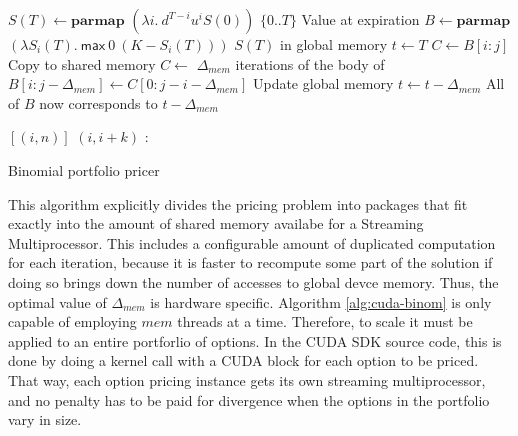 \begin{algorithm}
\begin{algorithmic}
  \State $S(T) \gets \mathbf{parmap}$ $(\lambda i.\ d^{T-i}u^{i}S(0))$ $\{0..T\}$ \Comment Value at expiration
  \State $B \gets \mathbf{parmap}$ $(\lambda S_i(T).\ \mathsf{max}\ 0\ (K-S_i(T)))$ $S(T)$ \Comment in global memory
  \State $t \gets T$
      \State $C \gets B[i:j] $ \Comment Copy to shared memory
      \State $C \gets$ $\Delta_{mem}$ iterations of the body of 
      \State $B[i:j-\Delta_{mem}] \gets C[0:j-i-\Delta_{mem}] $ \Comment Update global memory
    \EndFor
    \State $t \gets t -\Delta_{mem}$ \Comment All of $B$ now corresponds to $t -\Delta_{mem}$
  \EndWhile
\EndFunction

\State\Return $[(i,n)]$
\Else
\State
\Return $(i,i+k)$ : 
\EndIf
\EndFunction
\end{algorithmic}
\caption{Binomial portfolio pricer}
\label{alg:cuda-binom}
\end{algorithm}

This algorithm explicitly divides the pricing problem into packages that fit
exactly into the amount of shared memory availabe for a Streaming
Multiprocessor. This includes a configurable amount of duplicated computation
for each iteration, because it is faster to recompute some part of the solution
if doing so brings down the number of accesses to global devce memory. Thus,
the optimal value of $\Delta_{mem}$ is hardware specific.  Algorithm
\ref{alg:cuda-binom} is only capable of employing $mem$ threads at a time.
Therefore, to scale it must be applied to an entire portforlio of options.  In
the CUDA SDK source code, this is done by doing a kernel call with a CUDA block
for each option to be priced. That way, each option pricing instance gets its
own streaming multiprocessor, and no penalty has to be paid for divergence when
the options in the portfolio vary in size.

